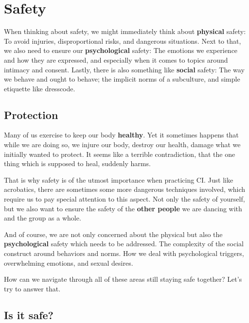 \section{Safety}\label{sec:safety}


When thinking about safety, we might immediately think about \textbf{physical} safety:
To avoid injuries, disproportional risks, and dangerous situations.
Next to that, we also need to ensure our \textbf{psychological} safety:
The emotions we experience and how they are expressed, and especially when it comes to topics around intimacy and consent.
Lastly, there is also something like \textbf{social} safety: The way we behave and ought to behave; the implicit norms of a subculture, and simple etiquette like dresscode.

\subsection{Protection}\label{subsec:protection}

Many of us exercise to keep our body \textbf{healthy}.
Yet it sometimes happens that while we are doing so, we injure our body, destroy our health, damage what we initially wanted to protect.
It seems like a terrible contradiction, that the one thing which is supposed to heal, suddenly harms.

That is why safety is of the utmost importance when practicing CI\@.
Just like acrobatics, there are sometimes some more dangerous techniques involved, which require us to pay special attention to this aspect.
Not only the safety of yourself, but we also want to ensure the safety of the \textbf{other people} we are dancing with and the group as a whole.

And of course, we are not only concerned about the physical but also the \textbf{psychological} safety which needs to be addressed.
The complexity of the social construct around behaviors and norms.
How we deal with psychological triggers, overwhelming emotions, and sexual desires.

How can we navigate through all of these areas still staying safe together?
Let's try to answer that.

\subsection{Is it safe?}\label{subsec:is-it-safe?}

